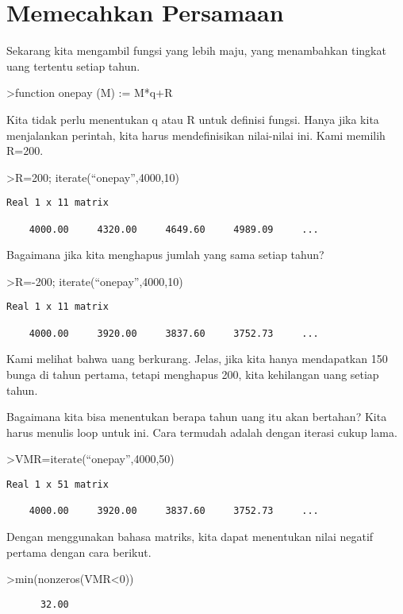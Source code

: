 \documentclass[
]{book}
\begin{document}
\section{Memecahkan Persamaan}\label{memecahkan-persamaan}

Sekarang kita mengambil fungsi yang lebih maju, yang menambahkan tingkat uang tertentu setiap tahun.

\textgreater function onepay (M) := M*q+R

Kita tidak perlu menentukan q atau R untuk definisi fungsi. Hanya jika kita menjalankan perintah, kita harus mendefinisikan nilai-nilai ini. Kami memilih R=200.

\textgreater R=200; iterate(``onepay'',4000,10)

\begin{verbatim}
Real 1 x 11 matrix

    4000.00     4320.00     4649.60     4989.09     ...
\end{verbatim}

Bagaimana jika kita menghapus jumlah yang sama setiap tahun?

\textgreater R=-200; iterate(``onepay'',4000,10)

\begin{verbatim}
Real 1 x 11 matrix

    4000.00     3920.00     3837.60     3752.73     ...
\end{verbatim}

Kami melihat bahwa uang berkurang. Jelas, jika kita hanya mendapatkan 150 bunga di tahun pertama, tetapi menghapus 200, kita kehilangan uang setiap tahun.

Bagaimana kita bisa menentukan berapa tahun uang itu akan bertahan? Kita harus menulis loop untuk ini. Cara termudah adalah dengan iterasi cukup lama.

\textgreater VMR=iterate(``onepay'',4000,50)

\begin{verbatim}
Real 1 x 51 matrix

    4000.00     3920.00     3837.60     3752.73     ...
\end{verbatim}

Dengan menggunakan bahasa matriks, kita dapat menentukan nilai negatif pertama dengan cara berikut.

\textgreater min(nonzeros(VMR\textless0))

\begin{verbatim}
      32.00 
\end{verbatim}
\end{document}

